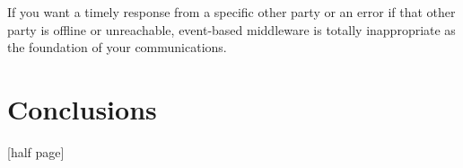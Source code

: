 \documentclass{acm_proc_article-sp}
\begin{document}
If you want a timely response from a specific other party or an error if that other party is offline or unreachable, event-based middleware is totally inappropriate as the foundation of your communications.



\section{Conclusions}

[half page]




\balancecolumns
\end{document}
